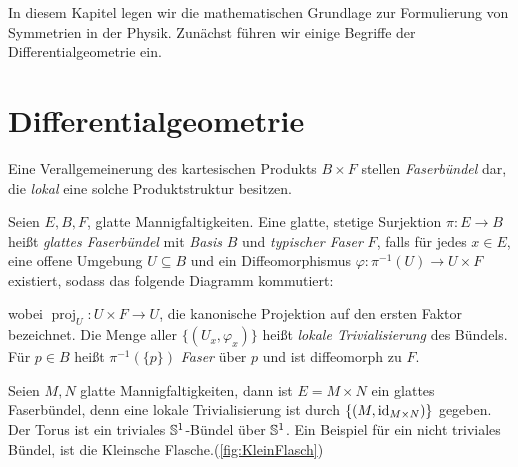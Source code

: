In diesem Kapitel legen wir die mathematischen Grundlage zur Formulierung von
Symmetrien in der Physik. Zunächst führen wir einige Begriffe der Differentialgeometrie
ein.
\section{Differentialgeometrie}
Eine Verallgemeinerung des kartesischen Produkts $B\times F$ stellen
\emph{Faserbündel} dar, die \emph{lokal} eine solche Produktstruktur besitzen. 
\begin{definition}[Faserbündel]
Seien $E,B,F$, glatte Mannigfaltigkeiten. Eine glatte, stetige
Surjektion $\pi:E\to B$  heißt \emph{glattes Faserbündel} mit \emph{Basis} $B$
und \emph{typischer Faser} $F$, falls für jedes $x\in E$, eine offene Umgebung
$U\subseteq B$ und ein Diffeomorphismus $\varphi:\pi^{-1}(U)\to U\times F$ existiert, sodass das
folgende Diagramm kommutiert:
\begin{center}
\end{center}
wobei $\operatorname{proj}_U:U\times F \to U$, die kanonische Projektion auf den
ersten Faktor bezeichnet. Die Menge aller $\{(U_x,\varphi_x)\}$ heißt
\emph{lokale Trivialisierung} des Bündels. Für $p\in B$ heißt $\pi^{-1}(\{p\})$
\emph{Faser} über $p$ und ist diffeomorph zu $F$.
\end{definition}
\begin{beispiel}
Seien $M,N$ glatte Mannigfaltigkeiten, dann ist $E=M\times N$ ein glattes
Faserbündel, denn eine lokale Trivialisierung
ist durch $\{(M,\operatorname{id}_{M\times N})\}$ gegeben. Der Torus
ist ein triviales $\mathbb{S}^1$-Bündel über
$\mathbb{S}^1$. Ein Beispiel für ein nicht triviales Bündel, ist die Kleinsche
Flasche.(\autoref{fig:KleinFlasch})
\end{beispiel}
